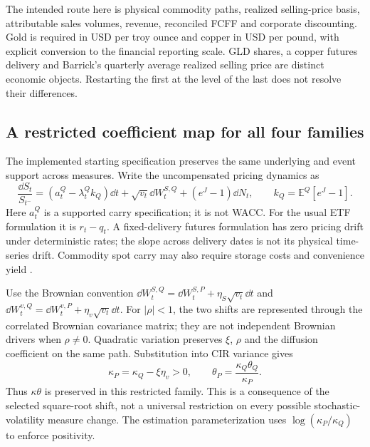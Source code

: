The intended route here is physical commodity paths, realized selling-price
basis, attributable sales volumes, revenue, reconciled FCFF and corporate
discounting. Gold is required in USD per troy ounce and copper in USD per
pound, with explicit conversion to the financial reporting scale. GLD shares,
a copper futures delivery and Barrick's quarterly average realized selling
price are distinct economic objects. Restarting the first at the level of
the last does not resolve their differences.

\subsection{A restricted coefficient map for all four families}

The implemented starting specification preserves the same underlying and
event support across measures. Write the uncompensated pricing dynamics as
\begin{equation}
\frac{\dd S_t}{S_{t^-}}=(a_t^{Q}-\lambda_t^{Q}k_Q)\dd t
 +\sqrt{v_t}\dd W_t^{S,Q}+(e^J-1)\dd N_t,
\qquad k_Q=\mathbb E^Q[e^J-1].
\label{eq:pq-price-start}
\end{equation}
Here $a_t^Q$ is a supported carry specification; it is not WACC. For the
usual ETF formulation it is $r_t-q_t$. A fixed-delivery futures formulation
has zero pricing drift under deterministic rates; the slope across delivery
dates is not its physical time-series drift. Commodity spot carry may also
require storage costs and convenience yield \cite{schwartz1997}.

Use the Brownian convention
$\dd W_t^{S,Q}=\dd W_t^{S,P}+\eta_S\sqrt{v_t}\dd t$ and
$\dd W_t^{v,Q}=\dd W_t^{v,P}+\eta_v\sqrt{v_t}\dd t$.
For $|\rho|<1$, the two shifts are represented through the correlated
Brownian covariance matrix; they are not independent Brownian drivers when
$\rho\ne0$. Quadratic variation preserves $\xi$, $\rho$ and the diffusion
coefficient on the same path. Substitution into CIR variance gives
\begin{equation}
\kappa_P=\kappa_Q-\xi\eta_v>0,\qquad
\theta_P=\frac{\kappa_Q\theta_Q}{\kappa_P}.
\label{eq:pq-variance-map}
\end{equation}
Thus $\kappa\theta$ is preserved in this restricted family. This is a
consequence of the selected square-root shift, not a universal restriction
on every possible stochastic-volatility measure change. The estimation
parameterization uses $\log(\kappa_P/\kappa_Q)$ to enforce positivity.

